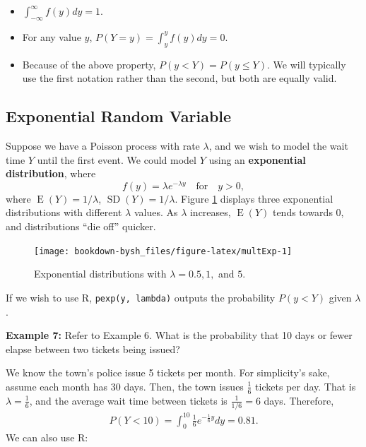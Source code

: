 \documentclass[
]{krantz}
\providecommand{\tightlist}{%
  \setlength{\itemsep}{0pt}\setlength{\parskip}{0pt}}
\newcommand{\E}{\operatorname{E}}
\newcommand{\SD}{\operatorname{SD}}
\begin{document}
\begin{itemize}
\tightlist
\item
  \(\int_{-\infty}^{\infty} f(y)dy = 1\).\\
\item
  For any value \(y\), \(P(Y = y) = \int_y^y f(y)dy = 0\).\\
\item
  Because of the above property, \(P(y < Y) = P(y \le Y)\). We will typically use the first notation rather than the second, but both are equally valid.
\end{itemize}

\hypertarget{exponential-random-variable}{%
\subsection{Exponential Random Variable}\label{exponential-random-variable}}

Suppose we have a Poisson process with rate \(\lambda\), and we wish to model the wait time \(Y\) until the first event. We could model \(Y\) using an \textbf{exponential distribution}, where
\begin{equation}
f(y) = \lambda e^{-\lambda y} \quad \textrm{for} \quad y > 0,
\label{eq:expRV}
\end{equation}
where \(\E(Y) = 1/\lambda\), \(\SD(Y) = 1/\lambda\). Figure \ref{fig:multExp} displays three exponential distributions with different \(\lambda\) values. As \(\lambda\) increases, \(\E(Y)\) tends towards 0, and distributions ``die off'' quicker.



\begin{figure}

{\centering \texttt{[image: bookdown-bysh\_files/figure-latex/multExp-1]} 

}

\caption{Exponential distributions with \(\lambda = 0.5, 1,\) and \(5\).}\label{fig:multExp}
\end{figure}

If we wish to use R, \texttt{pexp(y,\ lambda)} outputs the probability \(P(y < Y)\) given \(\lambda\).

\textbf{Example 7:} Refer to Example 6. What is the probability that 10 days or fewer elapse between two tickets being issued?

We know the town's police issue 5 tickets per month. For simplicity's sake, assume each month has 30 days. Then, the town issues \(\frac{1}{6}\) tickets per day. That is \(\lambda = \frac{1}{6}\), and the average wait time between tickets is \(\frac{1}{1/6} = 6\) days. Therefore,
\begin{align*}
P(Y < 10) = \int_{0}^{10} \textstyle \frac16 e^{-\frac16y} dy = 0.81.
\end{align*}
We can also use R:
\end{document}
